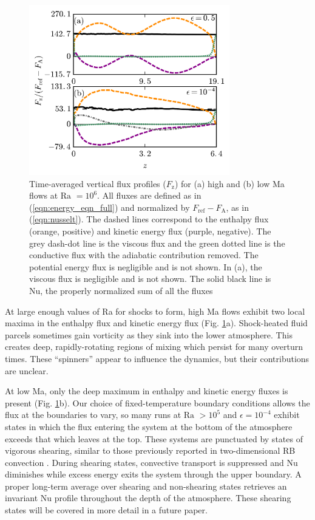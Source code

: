 \documentclass[aps, prl, twocolumn, nofootinbib, groupedaddress, amsfonts, amssymb, amsmath]{revtex4-1}
\begin{document}
\begin{figure}[t]
\includegraphics[width=3.4375in]{./figs/fluxes_fig.png}
\caption{Time-averaged vertical flux profiles ($F_{\text{z}}$)
for (a) high and (b) low Ma flows at $\text{Ra }= 10^6$.  
All fluxes are defined as in (\ref{eqn:energy_eqn_full}) and 
normalized by $F_{\text{ref}} - F_{\text{A}}$, as in (\ref{eqn:nusselt}).
The dashed lines correspond to the
enthalpy flux (orange, positive) and kinetic energy flux (purple, negative).  
The grey dash-dot line is the
viscous flux and the green dotted line is the conductive flux with the 
adiabatic contribution removed. The potential energy flux is negligible and is not shown.
In (a), the viscous flux is negligible and is not shown.  The solid black line is
Nu, the properly normalized sum of all the fluxes \label{fig:flux_profiles} }
\end{figure}

At large enough values of Ra for shocks to form,
high Ma flows exhibit two 
local maxima in the enthalpy flux and kinetic energy flux (Fig. \ref{fig:flux_profiles}a).
Shock-heated fluid parcels sometimes gain vorticity as
they sink into the lower atmosphere.
This creates deep, rapidly-rotating regions
of mixing which persist for many overturn times. These ``spinners'' appear to
influence the dynamics, but their contributions are unclear.

At low Ma, only the deep maximum in enthalpy and kinetic energy fluxes
is present (Fig. \ref{fig:flux_profiles}b).  
Our choice of fixed-temperature boundary conditions allows the flux at the 
boundaries to vary, so many runs at $\text{Ra }> 10^5$
and $\epsilon = 10^{-4}$ exhibit states in which the flux 
entering the system at the bottom of the atmosphere 
exceeds that which leaves at the top.  
These systems are punctuated by states of vigorous shearing, similar to those previously
reported in two-dimensional RB convection \cite{goluskin&all2014}.  
During shearing states, convective transport is suppressed and Nu diminishes while
excess energy exits the system through the upper boundary.
A proper long-term average over shearing
and non-shearing states retrieves an invariant Nu profile throughout the depth
of the atmosphere. 
These shearing states will be covered in more detail in a future paper. 
\end{document}
